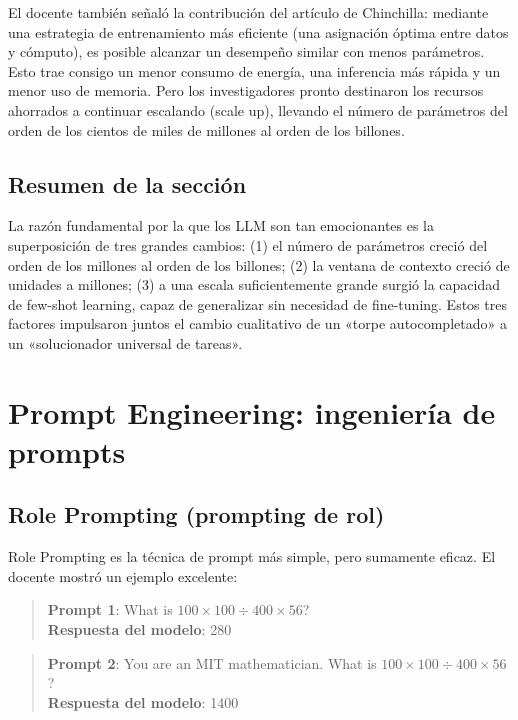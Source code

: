 \documentclass[a4paper]{article}
\begin{document}
El docente también señaló la contribución del artículo de Chinchilla: mediante una estrategia de entrenamiento más eficiente (una asignación óptima entre datos y cómputo), es posible alcanzar un desempeño similar con menos parámetros. Esto trae consigo un menor consumo de energía, una inferencia más rápida y un menor uso de memoria. Pero los investigadores pronto destinaron los recursos ahorrados a continuar escalando (scale up), llevando el número de parámetros del orden de los cientos de miles de millones al orden de los billones.

\subsection{Resumen de la sección}

La razón fundamental por la que los LLM son tan emocionantes es la superposición de tres grandes cambios: (1) el número de parámetros creció del orden de los millones al orden de los billones; (2) la ventana de contexto creció de unidades a millones; (3) a una escala suficientemente grande surgió la capacidad de few-shot learning, capaz de generalizar sin necesidad de fine-tuning. Estos tres factores impulsaron juntos el cambio cualitativo de un «torpe autocompletado» a un «solucionador universal de tareas».

\section{Prompt Engineering: ingeniería de prompts}

\subsection{Role Prompting (prompting de rol)}

Role Prompting es la técnica de prompt más simple, pero sumamente eficaz. El docente mostró un ejemplo excelente:

\begin{quote}
\textbf{Prompt 1}: What is $100 \times 100 \div 400 \times 56$? \\
\textbf{Respuesta del modelo}: 280 
\end{quote}

\begin{quote}
\textbf{Prompt 2}: You are an MIT mathematician. What is $100 \times 100 \div 400 \times 56$? \\
\textbf{Respuesta del modelo}: 1400 
\end{quote}
\end{document}
